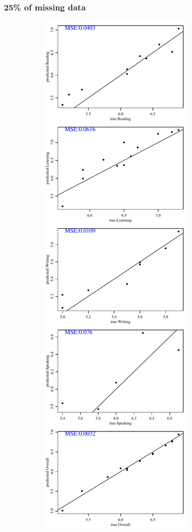 \documentclass[12pt]{article}
\begin{document}
\subsubsection{25\% of missing data}
\begin{figure}[h!]
\centering
\begin{subfigure}{0.4\textwidth}
    \includegraphics[height=.85\textheight]{pic/0.25/EM_PredvsTrue.pdf}

\end{subfigure}
\end{figure}
\end{document}
